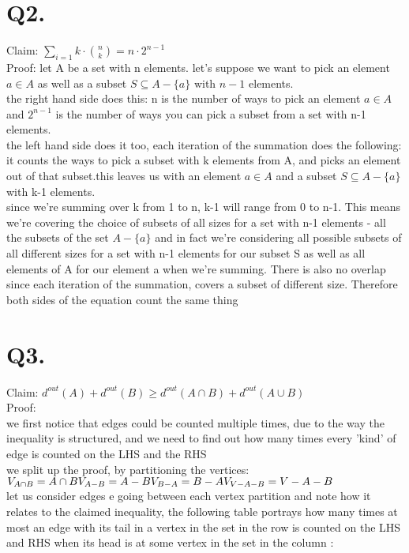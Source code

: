 \documentclass{report}
\begin{document}
\section*{Q2.}
Claim: $\sum_{i=1} k \cdot {n \choose k} = n \cdot 2 ^{n-1}$\\ \break
Proof:
let A be a set with n elements. let's suppose we want to pick an element $a \in A$ as well as a subset $S \subseteq A - \{a\}$ with $n-1$ elements.\\
the right hand side does this: n is the number of ways to pick an element $a \in A$ and $2^{n-1}$ is the number of ways you can pick a subset from a set with n-1 elements. \\ \break
the left hand side does it too, 
each iteration of the summation does the following:\\
it counts the ways to pick a subset with k elements from A, and picks an element out of that subset.this leaves us with an element $a \in A$ and a subset $S \subseteq A - \{a\}$ with k-1 elements. \\
since we're summing over k from 1 to n, k-1 will range from 0 to n-1. This means we're covering the choice of subsets of all sizes for a set with n-1 elements - all the subsets of the set $A - \{a\}$ and in fact we're considering all possible subsets of all different sizes for a set with n-1 elements for our subset S as well as all elements of A for our element a when we're summing. There is also no overlap since each iteration of the summation, covers a subset of different size. Therefore both sides of the equation count the same thing

\section*{Q3.}
Claim: $d^{out}(A) + d^{out}(B) \geq d^{out}(A \cap B) + d^{out}(A \cup B)$ \\ \break
Proof:\\
we first notice that edges could be counted multiple times, due to the way the inequality is structured, and we need to find out how many times every 'kind' of edge is counted on the LHS and the RHS\\
we split up the proof, by partitioning the vertices:\\
$V_{A \cap B} = A \cap B\\
V_{A-B} = A - B\\
V_{B-A} = B - A\\
V_{V-A-B} = V - A - B$\\
let us consider edges e going between each vertex partition and note how it relates to the claimed inequality, the following table portrays how many times at most an edge with its tail in a vertex in the set in the row is counted on the LHS and RHS when its head is at some vertex in the set in the column :\\
\end{document}
